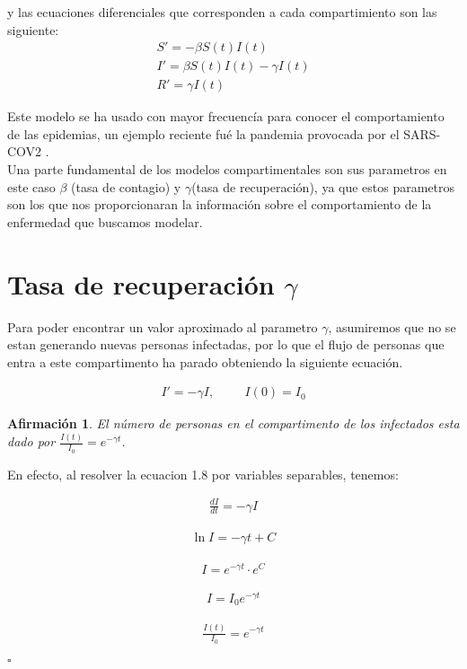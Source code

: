 \documentclass[a4paper,openany,12pt]{book}
\newtheorem{Af}{Afirmación}
\begin{document}
y las ecuaciones diferenciales que corresponden a cada compartimiento son las siguiente: 
\begin{align}
S' = -\beta S\left(t\right)I\left(t\right)\\			
I' = \beta S\left(t\right)I\left(t\right) - \gamma I\left(t\right)\\		
R' = \gamma I\left(t\right)
\end{align}

Este modelo se ha usado con mayor frecuencía para conocer el comportamiento de las epidemias, un ejemplo reciente fué la pandemia provocada por el SARS-COV2 \cite{Martcheva}.\\

Una parte fundamental de los modelos compartimentales son sus parametros en este caso $\beta$ (tasa de contagio) y $\gamma$(tasa de recuperación), ya que estos parametros son los que nos proporcionaran la información sobre el comportamiento de la enfermedad que buscamos modelar.\\

\section{Tasa de recuperación \textbf{$\gamma$}}

Para poder encontrar un valor aproximado al parametro $\gamma$, asumiremos que no se estan generando nuevas personas infectadas, por lo que el flujo de personas que entra a este compartimento ha parado obteniendo la siguiente ecuación.

\begin{align}
I' = -\gamma I, \hspace{1cm} I(0) = I_{0}
\end{align}

\begin{Af}
El número de personas en el compartimento de los infectados esta dado por $\frac{I(t)}{I_{0}} = e^{-\gamma t}$.
\end{Af}

\begin{Dem}
En efecto, al resolver la ecuacion 1.8 por variables separables, tenemos: 

\begin{align*}
\frac{dI}{dt} = - \gamma I
\end{align*}

\begin{align*}
\ln{I} = - \gamma t + C
\end{align*}

\begin{align*}
I = e^{- \gamma t} \cdot e^{C}
\end{align*}

\begin{align*}
I = I_{0} e^{- \gamma t}
\end{align*}

\begin{align*}
\frac{I(t)}{I_{0}} = e^{-\gamma t}
\end{align*}

\hfill	$\square$

\end{Dem}
\end{document}
